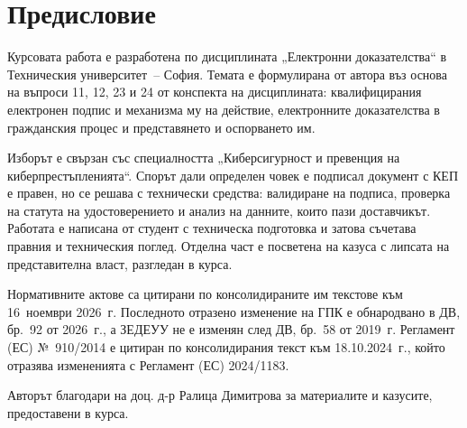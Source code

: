 \section*{Предисловие}
\label{sec:predislovie}

Курсовата работа е разработена по дисциплината „Електронни доказателства“ в Техническия
университет~-- София. Темата е формулирана от автора въз основа на въпроси 11, 12, 23 и 24
от конспекта на дисциплината: квалифицирания електронен подпис и механизма му на действие,
електронните доказателства в гражданския процес и представянето и оспорването им.

Изборът е свързан със специалността „Киберсигурност и превенция на киберпрестъпленията“.
Спорът дали определен човек е подписал документ с КЕП е правен, но се решава с технически
средства: валидиране на подписа, проверка на статута на удостоверението и анализ на
данните, които пази доставчикът. Работата е написана от студент с техническа подготовка и
затова съчетава правния и техническия поглед. Отделна част е посветена на казуса с липсата
на представителна власт, разгледан в курса.

Нормативните актове са цитирани по консолидираните им текстове към 16~ноември 2026~г.
Последното отразено изменение на ГПК е обнародвано в ДВ, бр.~92 от 2026~г., а ЗЕДЕУУ не е
изменян след ДВ, бр.~58 от 2019~г. Регламент (ЕС) №~910/2014 е цитиран по консолидирания
текст към 18.10.2024~г., който отразява измененията с Регламент (ЕС) 2024/1183.

Авторът благодари на доц. д-р Ралица Димитрова за материалите и казусите, предоставени в
курса.
